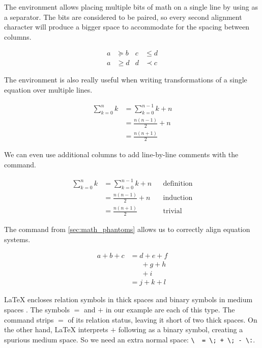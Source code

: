 The  environment allows placing multiple bits of math on a single line
by using \ai{\&} as a separator. The bits are considered to be paired, so every
second alignment character will produce a bigger space to accommodate for the
spacing between columns.
\begin{example}
\begin{align}
  a & \succeq b & c & \leq d \\
  a & \geq d & d & \prec c
\end{align}
\end{example}

The  environment is also really useful when writing transformations of
a single equation over multiple lines.
\begin{example}
\begin{align}
  \sum_{k=0}^n k
    &= \sum_{k=0}^{n-1} k + n \\
    &= \frac{n(n-1)}{2} + n \\
    &= \frac{n(n+1)}{2}
\end{align}
\end{example}
We can even use additional columns to add line-by-line
comments with the  command.
\begin{example}
\begin{align*}
  \sum_{k=0}^n k
    &= \sum_{k=0}^{n-1} k + n
      && \text{definition} \\
    &= \frac{n(n - 1)}{2} + n
      && \text{induction} \\
    &= \frac{n(n + 1)}{2}
      && \text{trivial}
\end{align*}
\end{example}

The  command from \autoref{sec:math_phantoms} allows us to
correctly align equation systems.
\begin{example}
\begin{align}
  a + b + c
    &= d + e + f \nonumber \\
    & \phantom{=}\ + g + h
               \nonumber \\
    & \phantom{=}\ + i \\
    &= j + k + l
\end{align}
\end{example}
\LaTeX{} encloses relation symbols in thick spaces \csi{;} and binary symbols in
medium spaces \csi{:}. The symbols \(=\) and \(+\) in our example are each of
this type. The  command strips \(=\) of its relation status, leaving
it short of two thick spaces. On the other hand, \LaTeX{} interprets \(+\)
following  as a binary symbol, creating a spurious medium space.
So we need an extra normal space: \verb*|\ |\verb| = \; + \; - \:|.

